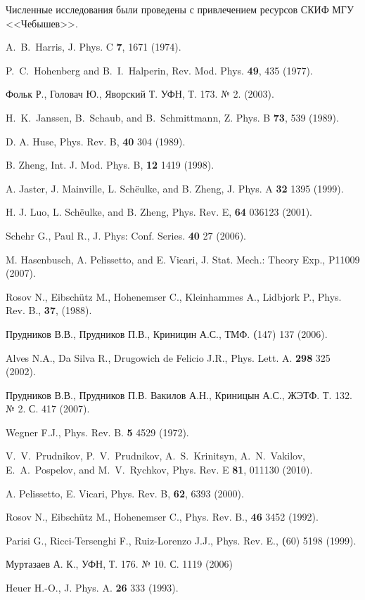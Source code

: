 \documentclass[12pt,a4paper]{article}
\begin{document}
Численные исследования были проведены с привлечением ресурсов СКИФ МГУ <<Чебышев>>.


\begin{thebibliography}{99}

A.~B.~Harris, J. Phys. C \textbf{7}, 1671 (1974).

P.~C.~Hohenberg and B.~I.~Halperin, Rev. Mod. Phys. \textbf{49}, 435 (1977).

Фольк Р., Головач Ю., Яворский Т. УФН, Т. 173. № 2. (2003).

H.~K.~Janssen, B.~Schaub, and B.~Schmittmann, Z. Phys. B \textbf{73}, 539 (1989).

D. A. Huse, Phys. Rev. B, \textbf{40} 304 (1989).

B. Zheng, Int. J. Mod. Phys. B, \textbf{12} 1419 (1998).

A. Jaster, J. Mainville, L. Sch\"eulke, and B. Zheng, J. Phys.
A \textbf{32} 1395 (1999).

H. J. Luo, L. Sch\"eulke, and B. Zheng, Phys. Rev. E, \textbf{64} 036123 (2001).

Schehr G., Paul R., J. Phys: Conf. Series. \textbf{40} 27 (2006).

M. Hasenbusch, A. Pelissetto, and E. Vicari, J. Stat. Mech.: Theory Exp., P11009 (2007).

Rosov N., Eibsch\"utz M., Hohenemser C., Kleinhammes A., Lidbjork P., Phys. Rev. B., \textbf{37}, (1988).

Прудников В.В., Прудников П.В., Криницин А.С., ТМФ. \textbf(147) 137 (2006).

Alves N.A., Da Silva R., Drugowich de Felicio J.R., Phys. Lett. A. \textbf{298} 325 (2002).

Прудников В.В., Прудников П.В. Вакилов А.Н., Криницын А.С., ЖЭТФ. Т. 132. № 2. С. 417 (2007).

Wegner F.J., Phys. Rev. B. \textbf{5} 4529 (1972).

V.~V.~Prudnikov, P.~V.~Prudnikov, A.~S.~Krinitsyn, A.~N.~Vakilov,
E.~A.~Pospelov, and M.~V.~Rychkov, Phys. Rev. E \textbf{81}, 011130 (2010).

A. Pelissetto, E. Vicari, Phys. Rev. B, \textbf{62}, 6393 (2000).

Rosov N., Eibsch\"utz M., Hohenemser C., Phys. Rev. B., \textbf{46} 3452 (1992).

Parisi G., Ricci-Tersenghi F., Ruiz-Lorenzo J.J., Phys. Rev. E., \textbf(60) 5198 (1999).

Муртазаев А. К., УФН, Т. 176. № 10. С. 1119 (2006)

Heuer H.-O., J. Phys. A. \textbf{26} 333 (1993).

\end{thebibliography}
\end{document}
